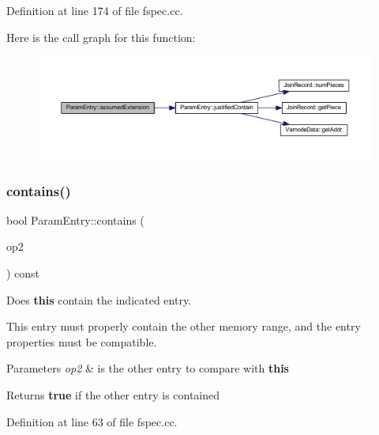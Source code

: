 Definition at line 174 of file fspec.\+cc.

Here is the call graph for this function\+:
\nopagebreak
\begin{figure}[H]
\begin{center}
\leavevmode
\includegraphics[width=350pt]{class_param_entry_ae81b887aea24a253882ce6562d10a7a0_cgraph}
\end{center}
\end{figure}
\mbox{\label{class_param_entry_a57be6dd1ea538a557fa636e53b392618}} 
\subsubsection{\texorpdfstring{contains()}{contains()}}
{\footnotesize\ttfamily bool Param\+Entry\+::contains (\begin{DoxyParamCaption}\item[{const \mbox{\hyperlink{class_param_entry}{Param\+Entry}} \&}]{op2 }\end{DoxyParamCaption}) const}



Does {\bfseries{this}} contain the indicated entry. 

This entry must properly contain the other memory range, and the entry properties must be compatible. 
\begin{DoxyParams}{Parameters}
{\em op2} & is the other entry to compare with {\bfseries{this}} \\
\hline
\end{DoxyParams}
\begin{DoxyReturn}{Returns}
{\bfseries{true}} if the other entry is contained 
\end{DoxyReturn}


Definition at line 63 of file fspec.\+cc.

\mbox{\label{class_param_entry_af0636e640bf34fb2d6a27f1daa39ba24}} 
